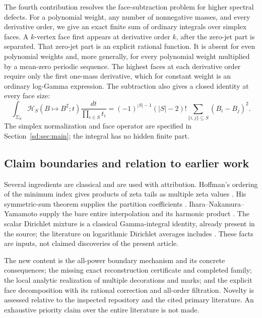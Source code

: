\documentclass[11pt,a4paper]{article}
\numberwithin{equation}{section}
\theoremstyle{definition}
\theoremstyle{remark}
\begin{document}
The fourth contribution resolves the face-subtraction problem for
higher spectral defects. For a polynomial weight, any number of
nonnegative masses, and every derivative order, we give an exact finite
sum of ordinary integrals over simplex faces. A $k$-vertex face first
appears at derivative order $k$, after the zero-jet part is separated.
That zero-jet part is an explicit rational function. It is absent for
even polynomial weights and, more generally, for every polynomial
weight multiplied by a mean-zero periodic sequence. The highest faces
at each derivative order require only the first one-mass derivative,
which for constant weight is an ordinary log-Gamma expression.
The subtraction also gives a closed identity at every face size:
\begin{equation}\label{intro:face}
 \int_{\Sigma_S}\mathcal H_S(B\mapsto B^2;t)
                  \frac{dt}{\prod_{i\in S}t_i}
 =(-1)^{|S|-1}(|S|-2)!
                 \sum_{\{i,j\}\subseteq S}(B_i-B_j)^2.
\end{equation}
The simplex normalization and face operator are specified in
Section~\ref{sd:sec:main}; the integral has no hidden finite part.

\subsection{Claim boundaries and relation to earlier work}

Several ingredients are classical and are used with attribution.
Hoffman's ordering of the minimum index gives products of zeta tails
as multiple zeta values \cite{HoffmanTails}. His symmetric-sum theorem
supplies the partition coefficients \cite{gm:Hoffman1992,gm:Hoffman2018}.
Ihara--Nakamura--Yamamoto supply the bare entire interpolation and its
harmonic product \cite{gm:INY}. The scalar Dirichlet mixture is a
classical Gamma-integral identity, already present in the source; the
literature on logarithmic Dirichlet averages includes
\cite{sd:Carlson1987,sd:Carlson1991}. These facts are inputs, not claimed
discoveries of the present article.

The new content is the all-power boundary mechanism and its concrete
consequences; the missing exact reconstruction certificate and completed
family; the local analytic realization of multiple decorations and
marks; and the explicit face decomposition with its rational correction
and all-order filtration. Novelty is assessed relative to the inspected
repository and the cited primary literature. An exhaustive priority
claim over the entire literature is not made.
\end{document}
